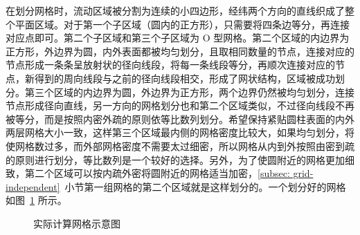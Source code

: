 在划分网格时，流动区域被分割为连续的小四边形，经纬两个方向的直线织成了整个平面区域。对于第一个子区域（圆内的正方形），只需要将四条边等分，再连接对应点即可。第二个子区域和第三个子区域为 O 型网格。第二个区域的内边界为正方形，外边界为圆，内外表面都被均匀划分，且取相同数量的节点，连接对应的节点形成一条条呈放射状的径向线段，将每一条线段等分，再顺次连接对应的节点，新得到的周向线段与之前的径向线段相交，形成了网状结构，区域被成功划分。第三个区域的内边界为圆，外边界为正方形，两个边界仍然被均匀划分，连接节点形成径向直线，另一方向的网格划分也和第二个区域类似，不过径向线段不再被等分，而是按照内密外疏的原则依等比数列划分。希望保持紧贴圆柱表面的内外两层网格大小一致，这样第三个区域最内侧的网格密度比较大，如果均匀划分，将使网格数过多，而外部网格密度不需要太过细密，所以网格从内到外按照由密到疏的原则进行划分，等比数列是一个较好的选择。另外，为了使圆附近的网格更加细致，第二个区域可以按内疏外密将圆附近的网格适当加密，\ref{subsec: grid-independent}~小节第一组网格的第二个区域就是这样划分的。一个划分好的网格如图~\ref{fig: sketch of grid} 所示。

\begin{figure}
	\centering
	\vspace{0.2em}
	\caption{实际计算网格示意图}\label{fig: sketch of grid}
\end{figure}

